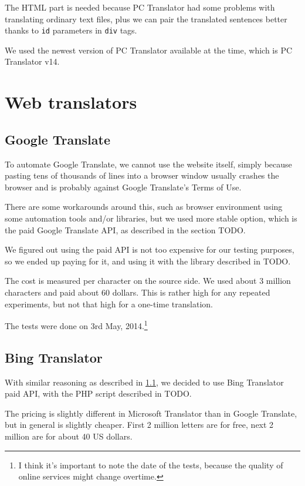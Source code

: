 The HTML part is needed because PC Translator had some problems with translating ordinary text files, plus we can pair the translated sentences better thanks to \texttt{id} parameters in \texttt{div} tags.

We used the newest version of PC Translator available at the time, which is PC Translator v14.

\section{Web translators}

\subsection{Google Translate}
\label{gtranslate_ex}

To automate Google Translate, we cannot use the website itself, simply because pasting tens of thousands of lines into a browser window usually crashes the browser and is probably against Google Translate's Terms of Use.

There are some workarounds around this, such as  browser environment using some automation tools and/or libraries, but we used more stable option, which is the paid Google Translate API, as described in the section TODO.


We figured out using the paid API is not too expensive for our testing purposes, so we ended up paying for it, and using it with the library described in TODO.

The cost is measured per character on the source side. We used about 3 million characters and paid about 60 dollars. This is rather high for any repeated experiments, but not that high for a one-time translation.

The tests were done on 3rd May, 2014.\footnote{I think it's important to note the date of the tests, because the quality of online services might change overtime.}
\subsection{Bing Translator}
With similar reasoning as described in \ref{gtranslate_ex}, we decided to use Bing Translator paid API, with the PHP script described in TODO.

The pricing is slightly different in Microsoft Translator than in Google Translate, but in general is slightly cheaper. First 2 million letters are for free, next 2 million are for about 40 US dollars.

